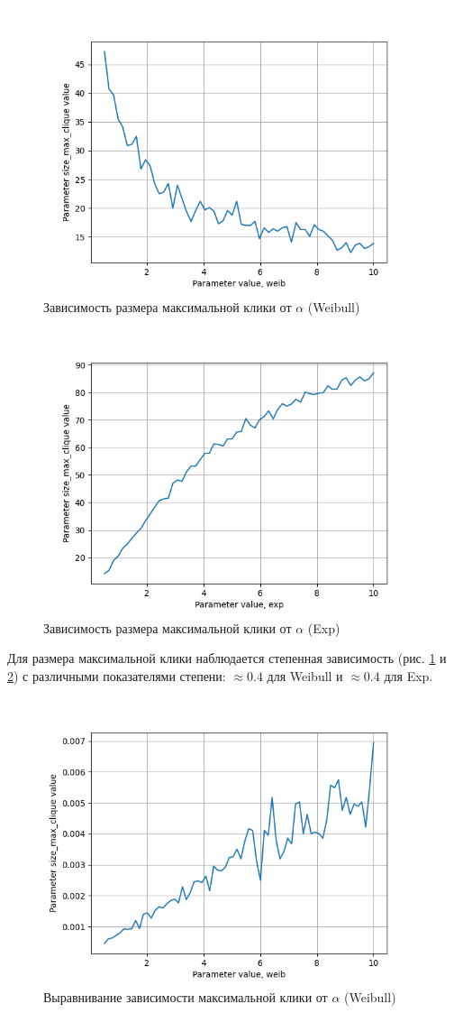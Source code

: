 \documentclass{HSEtitle}
\begin{document}
\begin{figure}[H]
    \centering
    \includegraphics[width=0.7\linewidth]{weib_alpha.png}
    \caption{Зависимость размера максимальной клики от $\alpha$ (Weibull)}
    \label{fig:weib_alpha}
\end{figure}

\begin{figure}[H]
    \centering
    \includegraphics[width=0.7\linewidth]{exp_alpha.png}
    \caption{Зависимость размера максимальной клики от $\alpha$ (Exp)}
    \label{fig:exp_alpha}
\end{figure}

Для размера максимальной клики наблюдается степенная зависимость (рис. \ref{fig:weib_alpha} и \ref{fig:exp_alpha}) с различными показателями степени: $\approx 0.4$ для Weibull и $\approx 0.4$ для Exp.

\begin{figure}[H]
    \centering
    \includegraphics[width=0.7\linewidth]{weib_alpha_fix.png}
    \caption{Выравнивание зависимости максимальной клики от $\alpha$ (Weibull)}
    \label{fig:weib_alpha_fix}
\end{figure}
\end{document}
